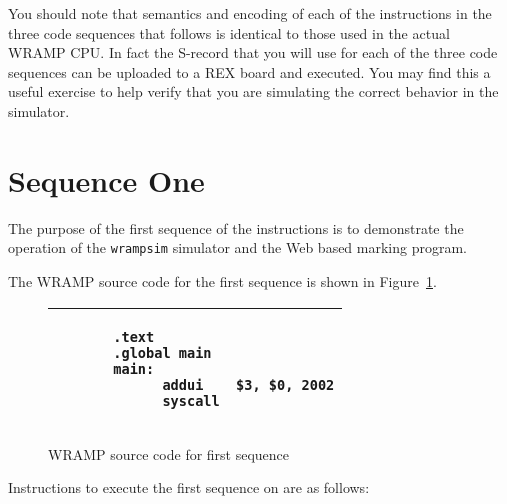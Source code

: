\documentclass[a4paper,10pt]{article}
\begin{document}
You should note that semantics and encoding of each of the
instructions in the three code sequences that follows is identical to
those used in the actual WRAMP CPU. In fact the S-record that you will
use for each of the three code sequences can be uploaded to a REX
board and executed. You may find this a useful exercise to help verify
that you are simulating the correct behavior in the simulator.

\section{Sequence One}

The purpose of the first sequence of the instructions is to
demonstrate the operation of the \texttt{wrampsim} simulator and the
Web based marking program.

The WRAMP source code for the first sequence is shown in
Figure~\ref{fig:seq1}.

\begin{figure}[h]
\begin{footnotesize}
\begin{center}
\begin{tabular}{|p{7cm}|}
\hline
\begin{verbatim}
       .text
       .global main
       main: 
             addui    $3, $0, 2002
             syscall
\end{verbatim}
\\
\hline
\end{tabular}
\end{center}
\end{footnotesize}
\caption{WRAMP source code for first sequence}
\label{fig:seq1}
\end{figure}

Instructions to execute the first sequence on  are as
follows:
\end{document}
